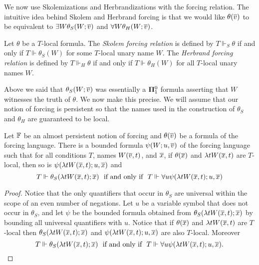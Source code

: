 We now use Skolemizations and Herbrandizations with the forcing relation.
The intuitive idea behind Skolem and Herbrand forcing is that we would like $\theta(\overline{v})$
to be equivalent to $\exists W\theta_S(W;\overline{v})$ and $\forall W\theta_H(W;\overline{v})$.

\begin{definition}
Let $\theta$ be a $T$-local formula.
The \textit{Skolem forcing relation} is defined by
$T\Vdash_S\theta$ if and only if $T\Vdash\theta_S(W)$ for some $T$-local unary name $W$.
The \textit{Herbrand forcing relation} is defined by
$T\Vdash_H\theta$ if and only if $T\Vdash\theta_H(W)$ for all $T$-local unary names $W$.
\end{definition}

Above we said that $\theta_S(W;\overline{v})$ was essentially a $\mathbf{\Pi}^0_1$ formula
asserting that $W$ witnesses the truth of $\theta$.
We now make this precise.
We will assume that our notion of forcing is persistent
so that the names used in the construction of $\theta_S$ and $\theta_H$
are guaranteed to be local.

\begin{prop}[\RCAo]\label{P:skolemisPi1}
Let $\mathbb{F}$ be an almost persistent notion of forcing and $\theta(\overline{v})$
be a formula of the forcing language.
There is a bounded formula $\psi(W;u,\overline{v})$ of the forcing language such that
for all conditions $T$, names $W(\overline{v},t)$, and $\overline{x}$,
if $\theta(\overline{x})$ and $\lambda tW(\overline{x},t)$ are $T$-local, then
so is $\psi(\lambda tW(\overline{x},t);u,\overline{x})$ and
$$T\Vdash\theta_S(\lambda tW(\tup{x},t);\tup{x})\ \ \text{if and only if}\ \ T\Vdash\forall u\psi(\lambda tW(\tup{x},t);u,\tup{x})$$
\end{prop}
\begin{proof}
Notice that the only quantifiers that occur in $\theta_S$ are universal within the scope
of an even number of negations.
Let $u$ be a variable symbol that does not occur in $\theta_S$, and let
$\psi$ be the bounded formula obtained from $\theta_S(\lambda tW(\overline{x},t);\overline{x})$
by bounding all universal quantifiers with $u$.
Notice that if $\theta(\overline{x})$ and $\lambda tW(\overline{x},t)$ are $T$-local
then $\theta_S(\lambda tW(\overline{x},t);\overline{x})$ and $\psi(\lambda tW(\overline{x},t);u,\overline{x})$
are also $T$-local.  Moreover
$$T\Vdash\theta_S(\lambda tW(\overline{x},t);\overline{x})\ \ \text{if and only if}\ \ T\Vdash\forall u\psi(\lambda tW(\overline{x},t);u,\overline{x}).$$
\end{proof}

